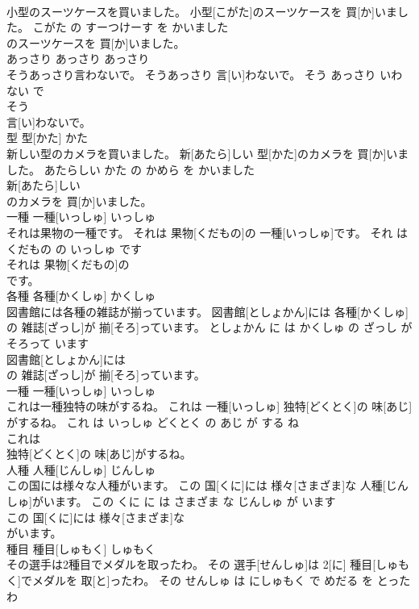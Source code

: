 \documentclass[8pt]{extreport}
\begin{document}
\begin{CJK}{UTF8}{min}
\\	小型のスーツケースを買いました。	小型[こがた]のスーツケースを 買[か]いました。	こがた の すーつけーす を かいました	
\\	のスーツケースを 買[か]いました。			
\\	あっさり	あっさり	あっさり	
\\	そうあっさり言わないで。	そうあっさり 言[い]わないで。	そう あっさり いわない で	
\\	そう
\\	言[い]わないで。			
\\	型	型[かた]	かた	
\\	新しい型のカメラを買いました。	新[あたら]しい 型[かた]のカメラを 買[か]いました。	あたらしい かた の かめら を かいました	
\\	新[あたら]しい
\\	のカメラを 買[か]いました。			
\\	一種	一種[いっしゅ]	いっしゅ	
\\	それは果物の一種です。	それは 果物[くだもの]の 一種[いっしゅ]です。	それ は くだもの の いっしゅ です	
\\	それは 果物[くだもの]の
\\	です。			
\\	各種	各種[かくしゅ]	かくしゅ	
\\	図書館には各種の雑誌が揃っています。	図書館[としょかん]には 各種[かくしゅ]の 雑誌[ざっし]が 揃[そろ]っています。	としょかん に は かくしゅ の ざっし が そろって います	
\\	図書館[としょかん]には
\\	の 雑誌[ざっし]が 揃[そろ]っています。			
\\	一種	一種[いっしゅ]	いっしゅ	
\\	これは一種独特の味がするね。	これは 一種[いっしゅ] 独特[どくとく]の 味[あじ]がするね。	これ は いっしゅ どくとく の あじ が する ね	
\\	これは
\\	独特[どくとく]の 味[あじ]がするね。			
\\	人種	人種[じんしゅ]	じんしゅ	
\\	この国には様々な人種がいます。	この 国[くに]には 様々[さまざま]な 人種[じんしゅ]がいます。	この くに に は さまざま な じんしゅ が います	
\\	この 国[くに]には 様々[さまざま]な
\\	がいます。			
\\	種目	種目[しゅもく]	しゅもく	
\\	その選手は2種目でメダルを取ったわ。	その 選手[せんしゅ]は 2[に] 種目[しゅもく]でメダルを 取[と]ったわ。	その せんしゅ は にしゅもく で めだる を とった わ	

\end{CJK}
\end{document}
